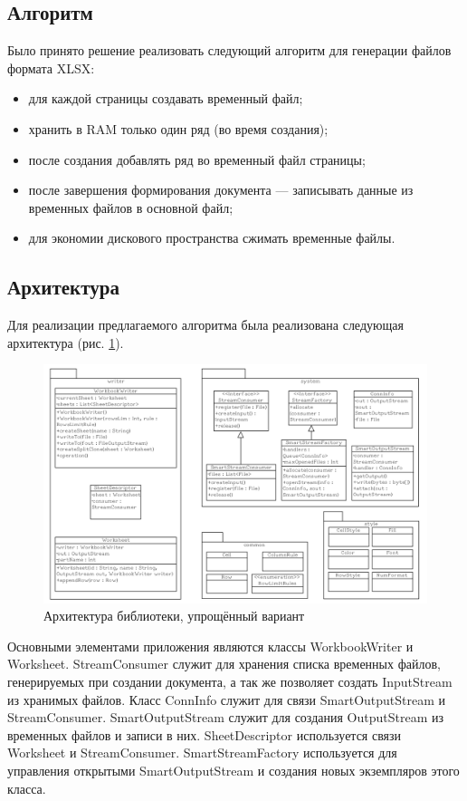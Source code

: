 \documentclass[14pt]{matmex-diploma}
\begin{document}
\subsection{Алгоритм}
Было принято решение реализовать следующий алгоритм для генерации файлов формата XLSX:
\begin{itemize}
    \item для каждой страницы создавать временный файл;
    \item хранить в RAM только один ряд (во время создания);
    \item после создания добавлять ряд во временный файл страницы;
    \item после завершения формирования документа --- записывать данные из временных файлов в основной файл;
    \item для экономии дискового пространства сжимать временные файлы.
\end{itemize}

\subsection{Архитектура}
Для реализации предлагаемого алгоритма была реализована следующая архитектура (рис. \ref{arch_lib}).

    \begin{figure}
        \centering
        \includegraphics[width=\textwidth]{pics/arch.png}
        \caption{Архитектура библиотеки, упрощённый вариант\label{arch_lib}}
    \end{figure}

Основными элементами приложения являются классы WorkbookWriter и Worksheet. StreamConsumer служит для хранения списка временных файлов, генерируемых при создании документа, а так же позволяет создать InputStream из хранимых файлов. Класс ConnInfo служит для связи SmartOutputStream и StreamConsumer. SmartOutputStream служит для создания OutputStream из временных файлов и записи в них. SheetDescriptor используется связи Worksheet и StreamConsumer. SmartStreamFactory используется для управления открытыми SmartOutputStream и создания новых экземпляров этого класса.
\end{document}
